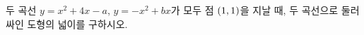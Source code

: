 두 곡선 $y=x^2+4x-a$, $y=-x^2+bx$가 모두 점 $(1{,}\mkern3mu\mathopen{}1)$을 지날 때, 두 곡선으로 둘러싸인 도형의 넓이를 구하시오. 
